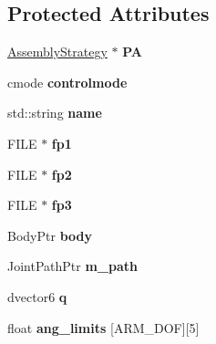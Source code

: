 \subsection*{Protected Attributes}
\begin{DoxyCompactItemize}
\item 
\hypertarget{classhiroArm_addf692c1741fb65d44a5147b072080ad}{\hyperlink{classAssemblyStrategy}{Assembly\-Strategy} $\ast$ {\bfseries P\-A}}\label{classhiroArm_addf692c1741fb65d44a5147b072080ad}

\item 
\hypertarget{classhiroArm_a7a1dcb206f544506a6a7682db98c8aff}{cmode {\bfseries controlmode}}\label{classhiroArm_a7a1dcb206f544506a6a7682db98c8aff}

\item 
\hypertarget{classhiroArm_a0bc88a2b6dc047e02f699ee83e13c970}{std\-::string {\bfseries name}}\label{classhiroArm_a0bc88a2b6dc047e02f699ee83e13c970}

\item 
\hypertarget{classhiroArm_a7686852c3087e04ffaacef6d9debd7df}{F\-I\-L\-E $\ast$ {\bfseries fp1}}\label{classhiroArm_a7686852c3087e04ffaacef6d9debd7df}

\item 
\hypertarget{classhiroArm_aa76ae3687822d66ac1c15767554378b1}{F\-I\-L\-E $\ast$ {\bfseries fp2}}\label{classhiroArm_aa76ae3687822d66ac1c15767554378b1}

\item 
\hypertarget{classhiroArm_a667d57ad53e218575ea5bf46c47835f1}{F\-I\-L\-E $\ast$ {\bfseries fp3}}\label{classhiroArm_a667d57ad53e218575ea5bf46c47835f1}

\item 
\hypertarget{classhiroArm_a9be626fdf0d7f8ad5ccfe1e58bf71cd8}{Body\-Ptr {\bfseries body}}\label{classhiroArm_a9be626fdf0d7f8ad5ccfe1e58bf71cd8}

\item 
\hypertarget{classhiroArm_a1c0a635880d06a60e71013a18ea73393}{Joint\-Path\-Ptr {\bfseries m\-\_\-path}}\label{classhiroArm_a1c0a635880d06a60e71013a18ea73393}

\item 
\hypertarget{classhiroArm_add995501c585c84318f106f8e75a93ef}{dvector6 {\bfseries q}}\label{classhiroArm_add995501c585c84318f106f8e75a93ef}

\item 
\hypertarget{classhiroArm_a52c93832cabb8ee2ff3fc04bc2281c39}{float {\bfseries ang\-\_\-limits} \mbox{[}A\-R\-M\-\_\-\-D\-O\-F\mbox{]}\mbox{[}5\mbox{]}}\label{classhiroArm_a52c93832cabb8ee2ff3fc04bc2281c39}


\end{DoxyCompactItemize}
